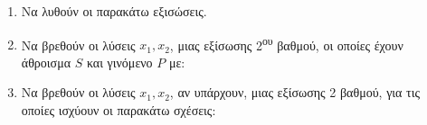 \begin{enumerate}
\item
Να λυθούν οι παρακάτω εξισώσεις.
\begin{multicols}{2}
\end{multicols}
\item
Να βρεθούν οι λύσεις $ x_1, x_2 $, μιας εξίσωσης 2\textsuperscript{ου} βαθμού, οι οποίες έχουν άθροισμα $ S $ και γινόμενο $ P $ με:
\begin{multicols}{2}
\end{multicols}
\item
Να βρεθούν οι λύσεις $ x_1, x_2 $, αν υπάρχουν, μιας εξίσωσης 2 βαθμού, για τις οποίες ισχύουν οι παρακάτω σχέσεις:
\end{enumerate}
